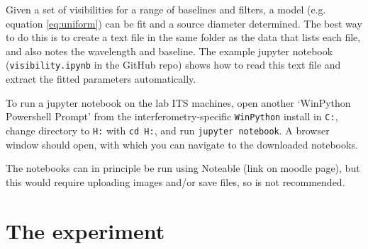 \documentclass[11pt]{article}
\begin{document}
Given a set of visibilities for a range of baselines and filters, a model (e.g. equation \ref{eq:uniform}) can be fit and a source diameter determined. The best way to do this is to create a text file in the same folder as the data that lists each file, and also notes the wavelength and baseline. The example jupyter notebook (\texttt{visibility.ipynb} in the GitHub repo) shows how to read this text file and extract the fitted parameters automatically.

To run a jupyter notebook on the lab ITS machines, open another `WinPython Powershell Prompt' from the interferometry-specific \texttt{WinPython} install in \texttt{C:}, change directory to \texttt{H:} with \texttt{cd H:}, and run \texttt{jupyter notebook}. A browser window should open, with which you can navigate to the downloaded notebooks.

The notebooks can in principle be run using Noteable (link on moodle page), but this would require uploading images and/or save files, so is not recommended.

\clearpage

\section{The experiment}\label{sec:exp}
\end{document}
